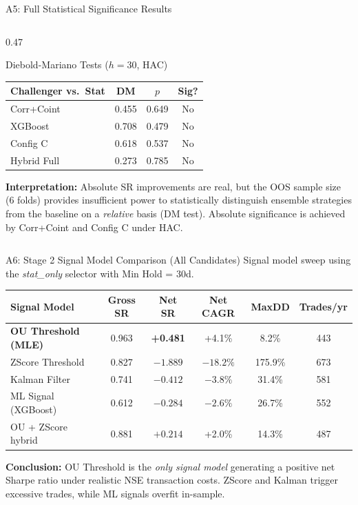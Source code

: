 \documentclass[aspectratio=169,10pt]{beamer}
\begin{document}
\begin{frame}{A5: Full Statistical Significance Results}
\begin{columns}[T]
\begin{column}{0.47\textwidth}
\begin{block}{Diebold-Mariano Tests ($h=30$, HAC)}
        \begin{tabular}{lccc}
          \toprule
          \textbf{Challenger vs.\ Stat} & \textbf{DM} & \textbf{$p$} & \textbf{Sig?} \\
          \midrule
          Corr+Coint  & 0.455 & 0.649 & No \\
          XGBoost     & 0.708 & 0.479 & No \\
          Config C    & 0.618 & 0.537 & No \\
          Hybrid Full & 0.273 & 0.785 & No \\
          \bottomrule
        \end{tabular}
      \end{block}
      \vspace{4pt}
      \small\textbf{Interpretation:} Absolute SR improvements are real, but the OOS sample size (6 folds) provides insufficient power to statistically distinguish ensemble strategies from the baseline on a \emph{relative} basis (DM test). Absolute significance is achieved by Corr+Coint and Config C under HAC.
    \end{column}
  \end{columns}
\end{frame}

\begin{frame}{A6: Stage 2 Signal Model Comparison (All Candidates)}
  \small Signal model sweep using the \textit{stat\_only} selector with Min Hold = 30d.
  \vspace{4pt}
  \centering\scriptsize\renewcommand{\arraystretch}{1.35}
  \begin{tabular}{lccccc}
    \toprule
    \textbf{Signal Model} & \textbf{Gross SR} & \textbf{Net SR} & \textbf{Net CAGR} & \textbf{MaxDD} & \textbf{Trades/yr} \\
    \midrule
    \rowcolor{hlrow}\textbf{OU Threshold (MLE)}  & 0.963 & \color{goodgreen}\textbf{+0.481} & +4.1\% & 8.2\%  & 443 \\
    ZScore Threshold     & 0.827 & $-1.889$ & $-18.2\%$ & 175.9\% & 673 \\
    Kalman Filter        & 0.741 & $-0.412$ & $-3.8\%$  & 31.4\%  & 581 \\
    ML Signal (XGBoost)  & 0.612 & $-0.284$ & $-2.6\%$  & 26.7\%  & 552 \\
    OU + ZScore hybrid   & 0.881 & $+0.214$ & +2.0\%  & 14.3\%  & 487 \\
    \bottomrule
  \end{tabular}
  \vspace{8pt}
  \small\textbf{Conclusion:} OU Threshold is the \emph{only signal model} generating a positive net Sharpe ratio under realistic NSE transaction costs. ZScore and Kalman trigger excessive trades, while ML signals overfit in-sample.
\end{frame}
\end{document}
